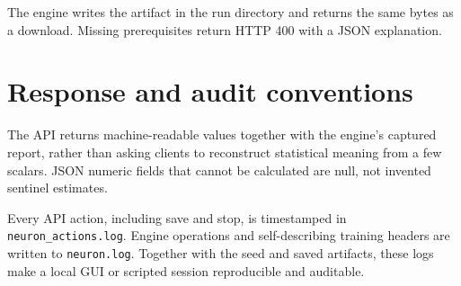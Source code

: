 The engine writes the artifact in the run directory and returns the
same bytes as a download.  Missing prerequisites return HTTP 400 with
a JSON explanation.

\section{Response and audit conventions}

The API returns machine-readable values together with the engine's
captured report, rather than asking clients to reconstruct statistical
meaning from a few scalars.  JSON numeric fields that cannot be
calculated are null, not invented sentinel estimates.

Every API action, including save and stop, is timestamped in
\texttt{neuron\_actions.log}.  Engine operations and self-describing
training headers are written to \texttt{neuron.log}.  Together with
the seed and saved artifacts, these logs make a local GUI or scripted
session reproducible and auditable.
